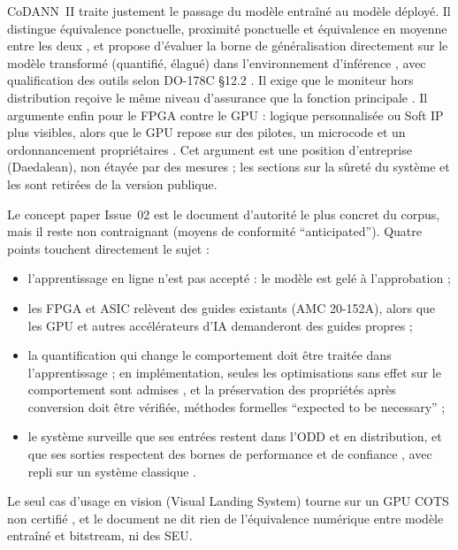 CoDANN~II \citep{2024-easa-concepts-design-assurance-neural-networks} traite justement le
passage du modèle entraîné au modèle déployé. Il distingue équivalence ponctuelle,
proximité ponctuelle et équivalence en moyenne entre les deux , et propose
d'évaluer la borne de généralisation directement sur le modèle transformé (quantifié,
élagué) dans l'environnement d'inférence , avec qualification des outils selon
DO-178C §12.2 . Il exige que le moniteur hors distribution reçoive le même
niveau d'assurance que la fonction principale . Il argumente enfin pour le FPGA
contre le GPU : logique personnalisée ou Soft IP plus visibles, alors que le GPU repose sur
des pilotes, un microcode et un ordonnancement propriétaires . Cet
argument est une position d'entreprise (Daedalean), non étayée par des mesures ; les
sections sur la sûreté du système et les  sont retirées de la version publique.

Le concept paper Issue~02 \citep{2024-easa-concept-paper-guidance-level-1} est le
document d'autorité le plus concret du corpus, mais il reste non contraignant (moyens de
conformité \enquote{anticipated}). Quatre points touchent directement le sujet :
\begin{itemize}
  \item l'apprentissage en ligne n'est pas accepté : le modèle est gelé à l'approbation
     ;
  \item les FPGA et ASIC relèvent des guides existants (AMC 20-152A), alors que les GPU et
    autres accélérateurs d'IA demanderont des guides propres  ;
  \item la quantification qui change le comportement doit être traitée dans l'apprentissage
     ; en implémentation, seules les optimisations sans effet sur le
    comportement sont admises , et la préservation des propriétés après
    conversion doit être vérifiée, méthodes formelles \enquote{expected to be necessary}
     ;
  \item le système surveille que ses entrées restent dans l'ODD et en distribution, et que
    ses sorties respectent des bornes de performance et de confiance ,
    avec repli sur un système classique .
\end{itemize}
Le seul cas d'usage en vision (Visual Landing System) tourne sur un GPU COTS non certifié
, et le document ne dit rien de l'équivalence numérique entre modèle
entraîné et bitstream, ni des SEU.

